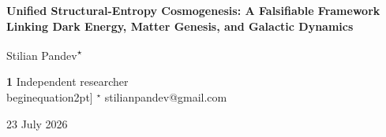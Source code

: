 \documentclass[submission, Phys]{SciPost}
\begin{document}
\begin{center}{\Large \textbf{Unified Structural-Entropy Cosmogenesis: A
Falsifiable Framework Linking Dark Energy, Matter Genesis, and Galactic
Dynamics}}\end{center}

\begin{center}
Stilian Pandev\textsuperscript{$\star$}\,
\end{center}

\begin{center}
{\bf 1} Independent researcher
\\begin{equation}2pt]
${}^\star$ {\small \sf stilianpandev@gmail.com}
\end{center}

\begin{center}
23 July 2026
\end{center}
\end{document}
